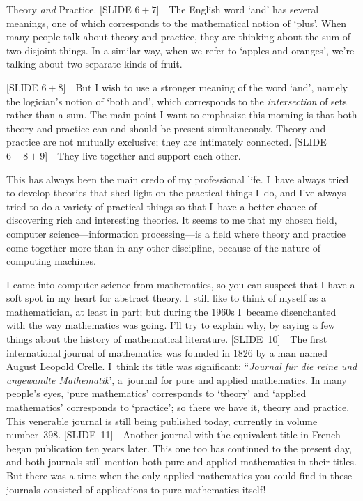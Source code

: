 Theory {\it and\/} Practice. [SLIDE $6+7$]\ \ The English word `and'
 has several meanings, one of which corresponds to the mathematical
notion of `plus'. When many people talk about theory and practice,
they are thinking about the sum of two disjoint things. In a similar
way, when we refer to `apples and oranges', we're talking about two
separate kinds of fruit.

[SLIDE $6+8$]\ \ But I wish to use a stronger meaning of the word
`and', namely the logician's notion of `both and', which corresponds
to the {\it intersection\/} of sets rather than a sum. The main point
I want to emphasize this morning is that both theory and practice can
and should be present simultaneously. Theory and practice are not
mutually exclusive; they are intimately connected. [SLIDE $6+8+9$]\ \ 
They live together and support each other.

This has always been the main credo of my professional life. I~have
always tried to develop theories that shed light on the practical
things I~do, and I've always tried to do a variety of practical things
so that I~have a better chance of discovering rich and interesting
theories. It seems to me that my chosen field, computer
science---information processing---is a field where theory and
practice come together more than in any other discipline, because of
the nature of computing machines.

I came into computer science from mathematics, so you can suspect that
I have a soft spot in my heart for abstract theory. I~still like to
think of myself as a mathematician, at least in part; but during the
1960s I~became disenchanted with the way mathematics was going. I'll
try to explain why, by saying a few things about the history of
mathematical literature. [SLIDE~10]\ \ The first international journal
of mathematics was founded in 1826 by a man named August Leopold
Crelle. I~think its title was significant: ``{\sl Journal f\"ur die
reine und angewandte Mathematik\/}', a~journal for pure and applied
mathematics. In many people's eyes, `pure mathematics' corresponds to
`theory' and `applied  mathematics' corresponds to `practice'; so
there we have it, theory and practice. This venerable journal is
still being published today, currently in volume number~398.
[SLIDE~11]\ \ Another journal with the equivalent title in French
began publication ten years later. This one too has continued to the
present day, and both journals still mention both pure and applied
mathematics in their titles. But there was a time when the only
applied mathematics you could find in these journals consisted of
applications to pure mathematics itself!


